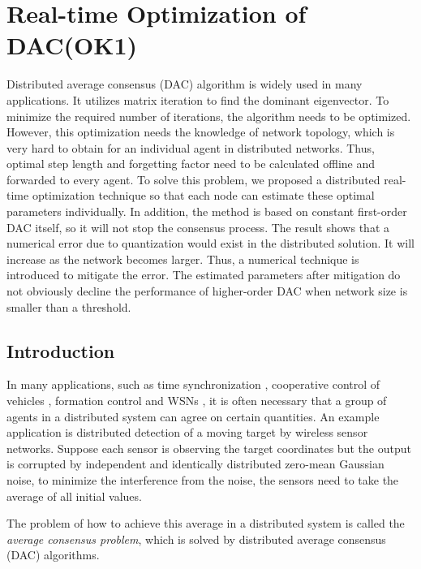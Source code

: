 
\chapter{\label{sec:Online-Optimization-of}Real-time Optimization of DAC(OK1)}

Distributed average consensus (DAC) algorithm is widely used in many
applications. It utilizes matrix iteration to find the dominant eigenvector.
To minimize the required number of iterations, the algorithm needs
to be optimized. However, this optimization needs the knowledge of
network topology, which is very hard to obtain for an individual agent
in distributed networks.  Thus, optimal step length and forgetting
factor need to be calculated offline and forwarded to every agent.
 To solve this problem, we proposed a distributed real-time optimization
technique so that each node can estimate these optimal parameters
individually. In addition, the method is based on constant first-order
DAC itself, so it will not stop the consensus process. The result
shows that a numerical error due to quantization would exist in the
distributed solution. It will increase as the network becomes larger.
Thus, a numerical  technique is introduced  to mitigate the error.
The estimated parameters after mitigation do not obviously  decline
the performance of higher-order DAC when network size is smaller than
a threshold. 




\section{Introduction}

In many applications, such as time synchronization \cite{Schenato2011},
cooperative control of vehicles \cite{Yang2010}, formation control
\cite{Olfati-Saber2012} and WSNs \cite{Hlinka2012}, it is often
necessary that a group of agents in a distributed system can agree
on certain quantities. An example application is distributed detection
of a moving target by wireless sensor networks. Suppose each sensor
is observing the target coordinates but the output is corrupted by
independent and identically distributed zero-mean Gaussian noise,
to minimize the interference from the noise, the sensors need to take
the average of all initial values. 

The problem of how to achieve this average in a distributed system
is called the \textit{average consensus problem},  which is solved
by distributed average consensus (DAC) algorithms. 

